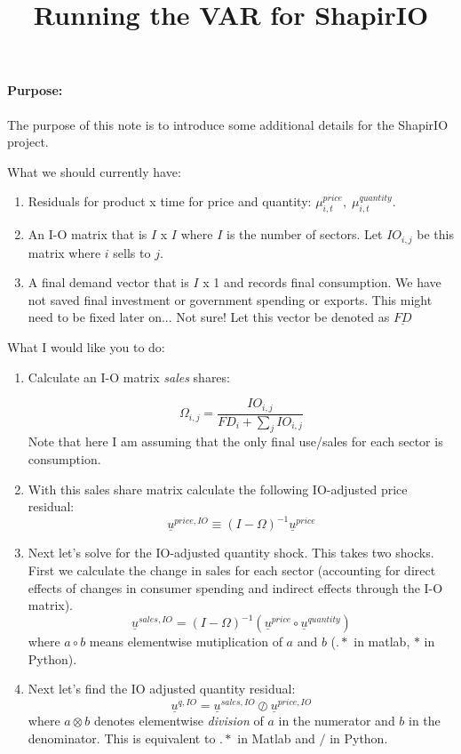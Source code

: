 \documentclass[12pt,english]{article}
\begin{document}


\title{Running the VAR for ShapirIO}
\maketitle

\paragraph{Purpose:} The purpose of this note is to introduce some additional details for the ShapirIO project.

What we should currently have:

\begin{enumerate}
	\item Residuals for product x time for price and quantity: $\mu_{i,t}^{price},\;\mu_{i,t}^{quantity}$.
	\item An I-O matrix that is $I$ x $I$ where $I$ is the number of sectors. Let $IO_{i,j}$ be this matrix where $i$ sells to $j$. 
	\item A final demand vector that is $I$ x 1 and records final consumption. We have not saved final investment or government spending or exports. This might need to be fixed later on... Not sure! Let this vector be denoted as $\underline{FD}$
\end{enumerate}

What I would like you to do:

\begin{enumerate}
	\item Calculate an I-O matrix \emph{sales} shares:
	
	\[
		\Omega_{i,j} = \frac{IO_{i,j}}{FD_i+ \sum_{j} IO_{i,j}}
	\]
	Note that here I am assuming that the only final use/sales for each sector is consumption.
	\item With this sales share matrix calculate the following IO-adjusted price residual:
	\[
		\underline{u}^{price,IO}\equiv (I-\Omega)^{-1}\underline{u}^{price}
	\]
	\item Next let's solve for the IO-adjusted quantity shock. This takes two shocks. First we calculate the change in sales for each sector (accounting for direct effects of changes in consumer spending and indirect effects through the I-O matrix). 
	\[
		\underline{u}^{sales,IO} = (I-\Omega)^{-1}(\underline{u}^{price}\circ \underline{u}^{quantity})
	\]
	where $a\circ b$ means elementwise mutiplication of $a$ and $b$ ($.*$ in matlab, $*$ in Python).
	\item Next let's find the IO adjusted quantity residual:
	\[
		\underline{u}^{q,IO} = \underline{u}^{sales,IO}\oslash\underline{u}^{price,IO}
	\]
	where $a \otimes b$ denotes elementwise \emph{division} of $a$ in the numerator and $b$ in the denominator. This is equivalent to $.*$ in Matlab and $/$ in Python.
\end{enumerate}
\end{document}
